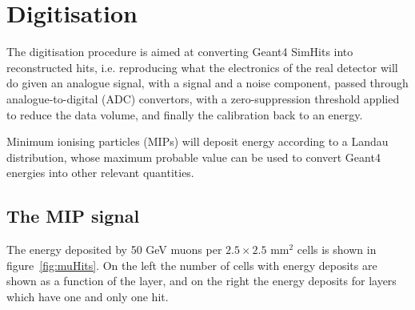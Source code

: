 \section{Digitisation}
\label{sec:digi}

The digitisation procedure is aimed at converting Geant4 SimHits into
reconstructed hits, i.e. reproducing what the electronics of the real
detector will do given an analogue signal, with a signal and a noise
component, passed through analogue-to-digital (ADC) convertors, with a
zero-suppression threshold applied to reduce the data volume, and
finally the calibration back to an energy.

Minimum ionising particles (MIPs) will deposit energy according to a
Landau distribution, whose maximum probable value can be used to
convert Geant4 energies into other relevant quantities. 

\subsection{The MIP signal}

The energy deposited by 50 GeV muons per $2.5\times 2.5$ mm$^2$ cells
is shown in figure~\ref{fig:muHits}. On the left the number of cells
with energy deposits are shown as a function of the layer, and on the
right the energy deposits for layers which have one and only one hit.

